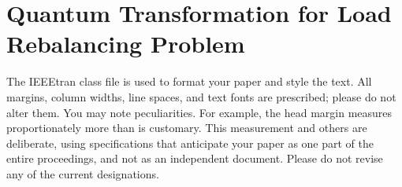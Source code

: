 
\section{Quantum Transformation for Load Rebalancing Problem} \label{sec:lrb_quantum_trans}

The IEEEtran class file is used to format your paper and style the text. All margins, column widths, line spaces, and text fonts are prescribed; please do not  alter them. You may note peculiarities. For example, the head margin
measures proportionately more than is customary. This measurement 
and others are deliberate, using specifications that anticipate your paper 
as one part of the entire proceedings, and not as an independent document. 
Please do not revise any of the current designations.

